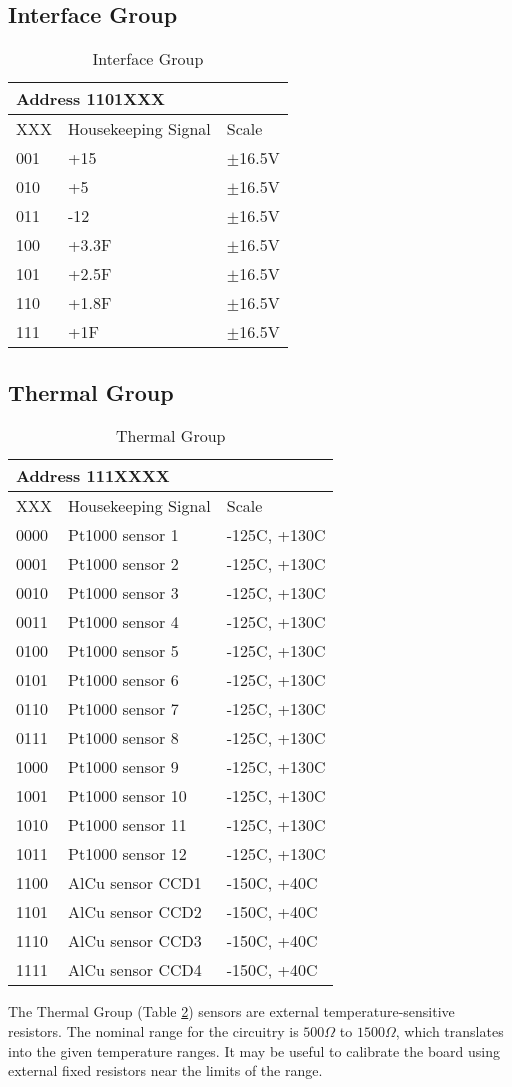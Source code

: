 \documentclass[12pt]{article}
\let\oldsubsection\subsection
\renewcommand{\subsection}{\FloatBarrier\oldsubsection}
\begin{document}
\subsection{Interface Group}
\begin{table}[ht!]
\caption{Interface Group}
\begin{tabular}{|l|l|l|}
\hline
\multicolumn{3}{|l|}{Address 1101XXX} \\
\hline
XXX & Housekeeping Signal & Scale  \\
\hline
001 & +15 & $\pm$16.5V\\
010 & +5 & $\pm$16.5V\\
011 & -12 & $\pm$16.5V\\
100 & +3.3F & $\pm$16.5V\\
101 & +2.5F & $\pm$16.5V\\
110 & +1.8F & $\pm$16.5V\\
111 & +1F & $\pm$16.5V\\
\hline
\end{tabular}
\label{inttab}
\end{table}
\subsection{Thermal Group}
\begin{table}[ht!]
\caption{Thermal Group}
\begin{tabular}{|l|l|l|}
\hline
\multicolumn{3}{|l|}{Address 111XXXX} \\
\hline
XXX & Housekeeping Signal & Scale  \\
\hline
0000 & Pt1000 sensor 1 & -125C, +130C\\
0001 & Pt1000 sensor 2 & -125C, +130C\\
0010 & Pt1000 sensor 3 & -125C, +130C\\
0011 & Pt1000 sensor 4 & -125C, +130C\\
0100 & Pt1000 sensor 5 & -125C, +130C\\
0101 & Pt1000 sensor 6 & -125C, +130C\\
0110 & Pt1000 sensor 7 & -125C, +130C\\
0111 & Pt1000 sensor 8 & -125C, +130C\\
1000 & Pt1000 sensor 9 & -125C, +130C\\
1001 & Pt1000 sensor 10 & -125C, +130C\\
1010 & Pt1000 sensor 11 & -125C, +130C\\
1011 & Pt1000 sensor 12 & -125C, +130C\\
1100 & AlCu sensor CCD1 & -150C, +40C\\
1101 & AlCu sensor CCD2 & -150C, +40C\\
1110 & AlCu sensor CCD3 & -150C, +40C\\
1111 & AlCu sensor CCD4 & -150C, +40C\\
\hline
\end{tabular}
\label{ttab}
\end{table}

The Thermal Group (Table \ref{ttab}) sensors are external temperature-sensitive resistors. The nominal range for the circuitry is $500\Omega$ to $1500\Omega$, which translates into the given temperature ranges. It may be useful to calibrate the board using external fixed resistors near the limits of the range.
\end{document}
